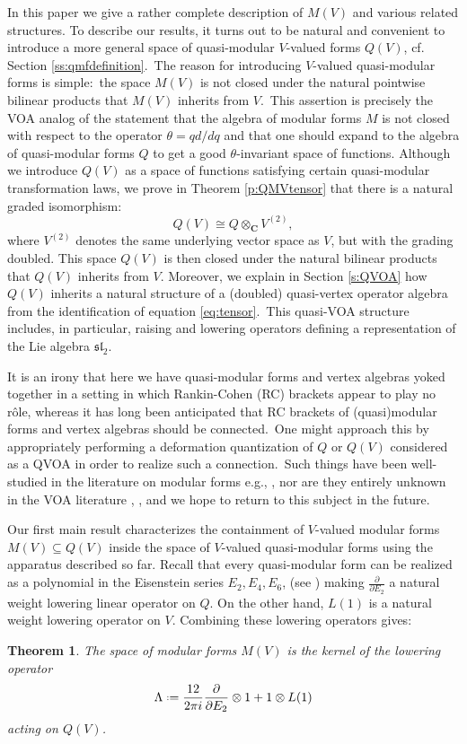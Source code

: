 \documentclass[12pt]{amsart}
\theoremstyle{plain}
\newtheorem{thm}{Theorem}[section]
\theoremstyle{definition}
\theoremstyle{remark}
\newcommand*{\df}{\mathrel{\vcenter{\baselineskip0.5ex \lineskiplimit0pt
                     \hbox{\scriptsize.}\hbox{\scriptsize.}}} =}
\newcommand{\CC}{\mathbf{C}}
\begin{document}
In this paper we give a rather complete description of $M(V)$ and various related structures. To describe our results, it turns out to be natural and convenient to introduce a more general space of quasi-modular $V$-valued forms $Q(V)$, cf. Section \ref{ss:qmfdefinition}.\ The reason for introducing $V$-valued quasi-modular forms is simple:\ the space $M(V)$ is not closed under the natural pointwise bilinear products that $M(V)$ inherits from $V$.\ This assertion is precisely the VOA analog of the statement that 
the algebra of modular forms $M$ is not closed with respect to the operator 
$\theta=qd/dq$ and that one should expand to the algebra of quasi-modular forms $Q$ 
to get a good $\theta$-invariant space of functions. Although we introduce $Q(V)$ as a space of functions satisfying certain quasi-modular transformation laws, we prove in Theorem \ref{p:QMVtensor} that there is a natural graded isomorphism:
\begin{equation}
\label{eq:tensor}
Q(V) \cong Q\otimes_{\CC} V^{(2)},    
\end{equation}
where $V^{(2)}$ denotes the same underlying vector space as $V$, but with the grading doubled. This space $Q(V)$ is then closed under the natural bilinear products that $Q(V)$ inherits from $V$. Moreover, we explain in Section \ref{s:QVOA} how $Q(V)$ inherits a natural structure of a (doubled) quasi-vertex operator algebra from the identification of equation \eqref{eq:tensor}.\ This quasi-VOA structure includes, in particular, raising and lowering operators defining a representation of the Lie algebra $\mathfrak{sl}_2$.\ 

It is an irony that here we have quasi-modular forms and vertex algebras yoked together in a setting in which Rankin-Cohen (RC) brackets  appear to play no r\^{o}le, whereas it has long been anticipated \cite{ZagierIndian} that RC brackets of (quasi)modular forms and vertex algebras should be connected.\ One might approach this by appropriately performing a deformation quantization of $Q$ or $Q(V)$ considered as a QVOA in order to realize such a connection.\ Such things have been well-studied in the literature on modular forms e.g., \cite{Choieetal},\cite{ConnesMovsati}  nor  are they entirely unknown in the VOA literature \cite{EtingofKazhdan}, \cite{Lih-adic}, and we hope to return to this subject in the future.

Our first main result characterizes the containment of $V$-valued modular forms $M(V) \subseteq Q(V)$ inside the space of $V$-valued quasi-modular forms using the apparatus described so far. Recall that every quasi-modular form can be realized as a polynomial in the Eisenstein series $E_2,E_4,E_6$, (see \cite{RoyerQuasi}) making $\tfrac{\partial}{\partial E_2}$ a natural weight lowering linear operator on $Q$. On the other hand, $L(1)$ is a natural weight lowering operator on $V$. Combining these lowering operators gives:  
\begin{thm}
    \label{mainthm1}
    The space of modular forms $M(V)$ is the kernel of the lowering operator 
    \[
    \Lambda \df \frac{12}{2\pi i } \frac{\partial}{\partial E_2}\otimes 1 + 1\otimes L(1)
    \]
    acting on $Q(V)$.
\end{thm}
\end{document}
